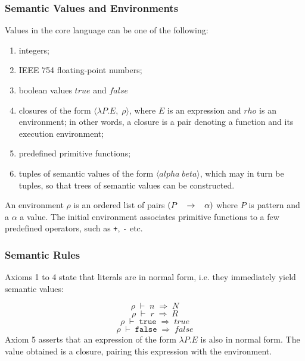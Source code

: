 \documentclass[10pt]{article}
\begin{document}
\subsubsection*{Semantic Values and Environments}
Values in the core language can be one of the following: \begin{enumerate}
\item integers;
\item IEEE 754 floating-point numbers;
\item boolean values $true$ and $false$
\item closures of the form $\langle{}\lambda{}P.E,\;\rho{}\rangle{}$, where $E$ is an expression and $rho$ is an environment; in other words, a closure is a pair denoting a function and its execution environment; 
\item predefined primitive functions;
\item tuples of semantic values of the form $\langle{}alpha\;beta\rangle{}$, which may in turn be tuples, so that trees of semantic values can be constructed. 
\end{enumerate}


An environment $\rho{}$ is an ordered list of pairs ${\mathrm\mathbf{}(}P\;\;\;\rightarrow{}\;\;\;\alpha{}{\mathrm\mathbf{})}$ where $P$ is pattern and a $\alpha{}$ a value. The initial
environment associates primitive functions to a few predefined
operators, such as \texttt{+}, \texttt{-} etc. 

\subsubsection*{Semantic Rules}
Axioms 1 to 4 state that literals are in normal form, i.e. they immediately yield semantic values: 

\begin{equation}
\rho{}\;\vdash{}\;n\;\Rightarrow{}\;N\end{equation}
\begin{equation}
\rho{}\;\vdash{}\;r\;\Rightarrow{}\;R\end{equation}
\begin{equation}
\rho{}\;\vdash{}\;\texttt{true}\;\Rightarrow{}\;true\end{equation}
\begin{equation}
\rho{}\;\vdash{}\;\texttt{false}\;\Rightarrow{}\;false\end{equation}
Axiom 5 asserts that an expression of the form $\lambda{}P.E$ is also in normal form. The
value obtained is a closure, pairing this expression with the
environment. 
\end{document}
